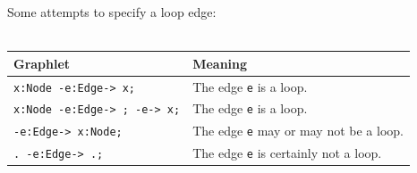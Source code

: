 \begin{example}
Some attempts to specify a loop edge:\\
\mbox{ }\\
\begin{tabular}[c]{ll}
 \textbf{Graphlet} & \textbf{Meaning} \\ \hline
 \texttt{x:Node -e:Edge-> x;} & The edge \texttt{e} is a loop.\\
 \texttt{x:Node -e:Edge-> ; -e-> x;} & The edge \texttt{e} is a loop.\\
 \texttt{-e:Edge-> x:Node;} & The edge \texttt{e} may or may not be a loop.\\
 \texttt{.\ -e:Edge-> .;} & The edge \texttt{e} is certainly not a loop.\\
\end{tabular}
\end{example}

